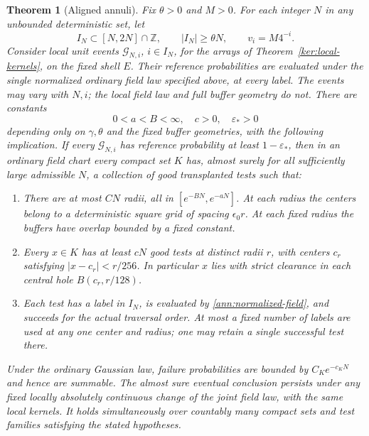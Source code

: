 \documentclass[11pt]{article}
\numberwithin{equation}{section}
\newtheorem{theorem}{Theorem}[section]
\theoremstyle{definition}
\theoremstyle{remark}
\newcommand{\1}{\mathbf 1}
\begin{document}
\begin{theorem}[Aligned annuli]\label{ann:aligned-annuli}
Fix \(\theta>0\) and \(M>0\).  For each integer \(N\) in any
unbounded deterministic set, let
\[
 I_N\subset[N,2N]\cap\mathbb Z,\qquad |I_N|\ge\theta N,\qquad
 v_i=M4^{-i}.
\]
Consider local unit events \(\mathcal G_{N,i}\), \(i\in I_N\),
for the arrays of Theorem~\ref{ker:local-kernels}, on the fixed
shell \(E\). Their reference probabilities are evaluated under the
single normalized ordinary field law specified above, at every label.
The events may vary with \(N,i\); the local field law and full
buffer geometry do not.  There are constants
\[
 0<a<B<\infty,\quad c>0,\quad \varepsilon_*>0
\]
depending only on \(\gamma,\theta\) and the fixed buffer geometries,
with the following implication.  If every \(\mathcal G_{N,i}\)
has reference probability at least \(1-\varepsilon_*\), then in
an ordinary field chart every compact set \(K\) has, almost surely
for all sufficiently large admissible \(N\), a collection of good
transplanted tests such that:
\begin{enumerate}
\item There are at most \(CN\) radii, all in
      \([e^{-BN},e^{-aN}]\).  At each radius the centers belong
      to a deterministic square grid of spacing
      \(\epsilon_0r\). At each fixed radius the buffers have overlap
      bounded by a fixed constant.
\item Every \(x\in K\) has at least \(cN\) good tests at
      distinct radii \(r\), with centers \(c_r\) satisfying
      \(|x-c_r|<r/256\).  In particular \(x\) lies with strict
      clearance in each central hole \(B(c_r,r/128)\).
\item Each test has a label in \(I_N\), is evaluated by
      \eqref{ann:normalized-field}, and succeeds for the actual
      traversal order.  At most a fixed number of labels are
      used at any one center and radius; one may retain a single
      successful test there.
\end{enumerate}
Under the ordinary Gaussian law, failure probabilities are bounded
by \(C_Ke^{-c_KN}\) and hence are summable.  The almost sure
eventual conclusion persists under any fixed locally absolutely
continuous change of the joint field law, with the same local
kernels.  It holds simultaneously over countably many compact
sets and test families satisfying the stated hypotheses.
\end{theorem}
\end{document}
